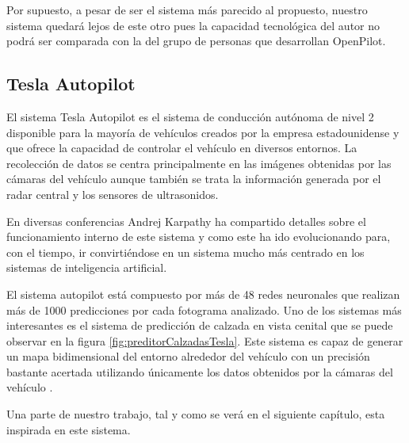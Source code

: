 Por supuesto, a pesar de ser el sistema más parecido al propuesto, nuestro sistema quedará lejos de este otro pues la capacidad tecnológica del autor no podrá ser comparada con la del grupo de personas que desarrollan OpenPilot.


\subsection{Tesla Autopilot}

El sistema Tesla Autopilot es el sistema de conducción autónoma de nivel 2 disponible para la mayoría de vehículos creados por la empresa estadounidense y que ofrece la capacidad de controlar el vehículo en diversos entornos.
La recolección de datos se centra principalmente en las imágenes obtenidas por las cámaras del vehículo aunque también se trata la información generada por el radar central y los sensores de ultrasonidos.

En diversas conferencias Andrej Karpathy ha compartido detalles sobre el funcionamiento interno de este sistema y como este ha ido evolucionando para, con el tiempo, ir convirtiéndose en un sistema mucho más centrado en los sistemas de inteligencia artificial.

El sistema autopilot está compuesto por más de 48 redes neuronales que realizan más de 1000 predicciones por cada fotograma analizado. Uno de los sistemas más interesantes es el sistema de predicción de calzada en vista cenital que se puede observar en la figura \ref{fig:preditorCalzadasTesla}. Este sistema es capaz de generar un mapa bidimensional del entorno alrededor del vehículo con un precisión bastante acertada utilizando únicamente los datos obtenidos por la cámaras del vehículo \cite{teslaAutonomyDay} \cite{karpathyAI} \cite{karpathyPytorch}.

Una parte de nuestro trabajo, tal y como se verá en el siguiente capítulo, esta inspirada en este sistema.

